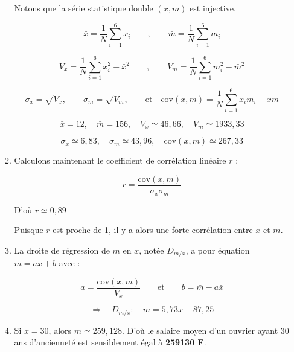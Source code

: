 \documentclass[12pt,a4paper]{article}
\begin{document}
\begin{enumerate}
\begin{enumerate}
    Notons que la série statistique double \( (x, m) \) est injective.

    \[
    \bar{x} = \frac{1}{N} \sum\limits_{i=1}^{6} x_i 
    \qquad , \qquad 
    \bar{m} = \frac{1}{N} \sum\limits_{i=1}^{6} m_i
    \]

    \[
    V_x = \frac{1}{N} \sum\limits_{i=1}^{6} x_i^2 - \bar{x}^2 
    \qquad , \qquad 
    V_m = \frac{1}{N} \sum\limits_{i=1}^{6} m_i^2 - \bar{m}^2
    \]

    \[
    \sigma_x = \sqrt{V_x}, \qquad 
    \sigma_m = \sqrt{V_m}, \qquad 
    \text{et} \quad \text{cov}(x, m) = \frac{1}{N} \sum\limits_{i=1}^{6} x_i m_i - \bar{x}\bar{m}
    \]

    \[
    \bar{x} = 12, \quad 
    \bar{m} = 156, \quad 
    V_x \simeq 46{,}66, \quad 
    V_m \simeq 1933{,}33
    \]

    \[
    \sigma_x \simeq 6{,}83, \quad 
    \sigma_m \simeq 43{,}96, \quad 
    \text{cov}(x, m) \simeq 267{,}33
    \]
    
    \item Calculons maintenant le coefficient de corrélation linéaire \( r \) :

    \[
    r = \frac{\text{cov}(x, m)}{\sigma_x \sigma_m}
    \]

    D'où \( r \simeq 0{,}89 \)

    Puisque \( r \) est proche de 1, il y a alors une forte corrélation entre \( x \) et \( m \).
    \item La droite de régression de \( m \) en \( x \), notée \( D_{m/x} \), a pour équation \( m = ax + b \) avec :

  \[
  a = \frac{\text{cov}(x, m)}{V_x} 
  \qquad \text{et} \qquad 
  b = \bar{m} - a \bar{x}
  \]

  \[
  \Rightarrow \quad D_{m/x} : \quad m = 5{,}73x + 87{,}25
  \]

   \item Si \( x = 30 \), alors \( m \simeq 259{,}128 \). D'où le salaire moyen d'un ouvrier ayant 30 ans d'ancienneté est sensiblement égal à \textbf{259130 F}.

  \end{enumerate}
\end{enumerate}
\end{document}
